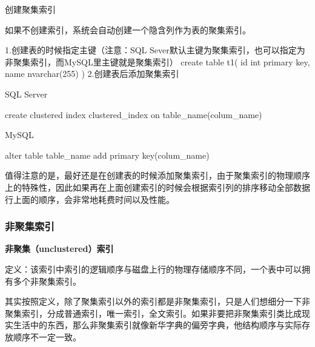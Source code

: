 \documentclass[UTF8]{ctexart}
\begin{document}
创建聚集索引

如果不创建索引，系统会自动创建一个隐含列作为表的聚集索引。

1.创建表的时候指定主键（注意：SQL Sever默认主键为聚集索引，也可以指定为非聚集索引，而MySQL里主键就是聚集索引）
create table t1(
    id int primary key,
    name nvarchar(255)
)
2.创建表后添加聚集索引

SQL Server

create clustered index clustered\_index on table\_name(colum\_name)

MySQL

alter table table\_name add primary key(colum\_name)

值得注意的是，最好还是在创建表的时候添加聚集索引，由于聚集索引的物理顺序上的特殊性，因此如果再在上面创建索引的时候会根据索引列的排序移动全部数据行上面的顺序，会非常地耗费时间以及性能。

\subsubsection{非聚集索引}

\textbf{非聚集（unclustered）索引}

定义：该索引中索引的逻辑顺序与磁盘上行的物理存储顺序不同，一个表中可以拥有多个非聚集索引。

其实按照定义，除了聚集索引以外的索引都是非聚集索引，只是人们想细分一下非聚集索引，分成普通索引，唯一索引，全文索引。如果非要把非聚集索引类比成现实生活中的东西，那么非聚集索引就像新华字典的偏旁字典，他结构顺序与实际存放顺序不一定一致。
\end{document}
